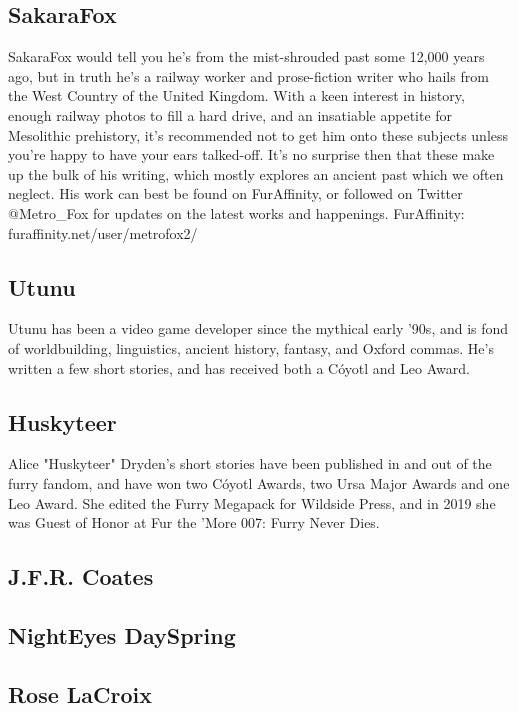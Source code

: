 \subsection*{SakaraFox}
SakaraFox would tell you he’s from the mist-shrouded past some 12,000 years ago, but in truth he’s a railway worker and prose-fiction writer who hails from the West Country of the United Kingdom. With a keen interest in history, enough railway photos to fill a hard drive, and an insatiable appetite for Mesolithic prehistory, it’s recommended not to get him onto these subjects unless you’re happy to have your ears talked-off. It’s no surprise then that these make up the bulk of his writing, which mostly explores an ancient past which we often neglect. His work can best be found on FurAffinity, or followed on Twitter @Metro\_Fox for updates on the latest works and happenings. FurAffinity: furaffinity.net/user/metrofox2/

\subsection*{Utunu}
Utunu has been a video game developer since the mythical early '90s, and is fond of worldbuilding, linguistics, ancient history, fantasy, and Oxford commas. He's written a few short stories, and has received both a Cóyotl and Leo Award.

\subsection*{Huskyteer}
Alice "Huskyteer" Dryden's short stories have been published in and out of the furry fandom, and have won two Cóyotl Awards, two Ursa Major Awards and one Leo Award. She edited the Furry Megapack for Wildside Press, and in 2019 she was Guest of Honor at Fur the 'More 007: Furry Never Dies.

\subsection*{J.F.R. Coates}

\subsection*{NightEyes DaySpring}

\subsection*{Rose LaCroix}

